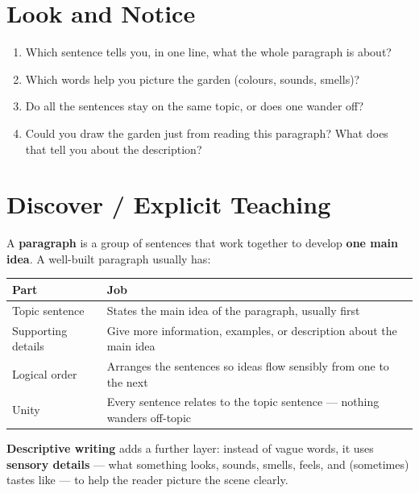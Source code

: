 \section{Look and Notice}
\begin{thinkbox}
\begin{enumerate}
    \item Which sentence tells you, in one line, what the whole paragraph is about?
    \item Which words help you picture the garden (colours, sounds, smells)?
    \item Do all the sentences stay on the same topic, or does one wander off?
    \item Could you draw the garden just from reading this paragraph? What does that tell you about the description?
\end{enumerate}
\end{thinkbox}

\section{Discover / Explicit Teaching}
A \textbf{paragraph} is a group of sentences that work together to develop \textbf{one main idea}. A well-built paragraph usually has:

\begin{table}[h!]
\centering
\begin{tabular}{|l|l|}
\hline
\textbf{Part} & \textbf{Job} \\
\hline
Topic sentence & States the main idea of the paragraph, usually first \\
Supporting details & Give more information, examples, or description about the main idea \\
Logical order & Arranges the sentences so ideas flow sensibly from one to the next \\
Unity & Every sentence relates to the topic sentence — nothing wanders off-topic \\
\hline
\end{tabular}
\end{table}

\textbf{Descriptive writing} adds a further layer: instead of vague words, it uses \textbf{sensory details} — what something looks, sounds, smells, feels, and (sometimes) tastes like — to help the reader picture the scene clearly.

